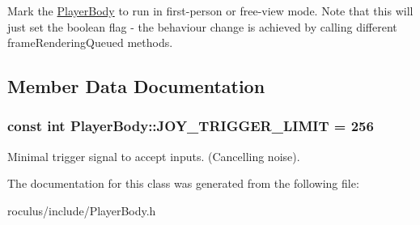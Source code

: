 \-Mark the \hyperlink{classPlayerBody}{\-Player\-Body} to run in first-\/person or free-\/view mode. \-Note that this will just set the boolean flag -\/ the behaviour change is achieved by calling different frame\-Rendering\-Queued methods. 

\subsection{\-Member \-Data \-Documentation}
\hypertarget{classPlayerBody_a82eef395a2ecbc593ffcb074178dbf69}{
\subsubsection[{\-J\-O\-Y\-\_\-\-T\-R\-I\-G\-G\-E\-R\-\_\-\-L\-I\-M\-I\-T}]{\setlength{\rightskip}{0pt plus 5cm}const int {\bf \-Player\-Body\-::\-J\-O\-Y\-\_\-\-T\-R\-I\-G\-G\-E\-R\-\_\-\-L\-I\-M\-I\-T} = 256}}\label{classPlayerBody_a82eef395a2ecbc593ffcb074178dbf69}
\-Minimal trigger signal to accept inputs. (\-Cancelling noise). 

\-The documentation for this class was generated from the following file\-:\begin{DoxyCompactItemize}
\item 
roculus/include/\-Player\-Body.\-h\end{DoxyCompactItemize}
